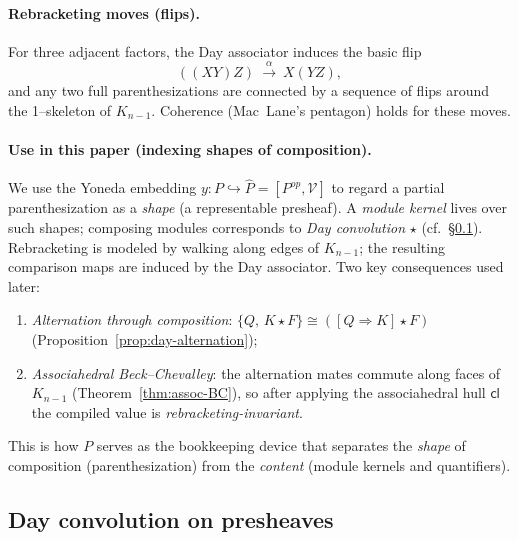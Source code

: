 \documentclass[11pt]{article}
\numberwithin{equation}{section}
\theoremstyle{upright}
\newcommand{\V}{\mathcal{V}}
\begin{document}
\paragraph{Rebracketing moves (flips).}
For three adjacent factors, the Day associator induces the basic flip
\[
((XY)Z)\ \xrightarrow{\ \alpha\ }\ X(YZ),
\]
and any two full parenthesizations are connected by a sequence of flips around the
1–skeleton of $K_{n-1}$. Coherence (Mac~Lane’s pentagon) holds for these moves.

\begin{center}
\end{center}

\paragraph{Use in this paper (indexing shapes of composition).}
We use the Yoneda embedding $y:P\hookrightarrow \widehat P=[P^{op},\V]$ to regard a
partial parenthesization as a \emph{shape} (a representable presheaf).
A \emph{module kernel} lives over such shapes; composing modules corresponds to
\emph{Day convolution} $\star$ (cf.\ \S\ref{subsec:day-conv}).
Rebracketing is modeled by walking along edges of $K_{n-1}$; the resulting comparison
maps are induced by the Day associator.
Two key consequences used later:
\begin{enumerate}[leftmargin=*, itemsep=.25ex]
\item \emph{Alternation through composition}:
$\{Q,\,K\star F\}\cong ([Q\Rightarrow K]\star F)$ (Proposition~\ref{prop:day-alternation});
\item \emph{Associahedral Beck--Chevalley}:
the alternation mates commute along faces of $K_{n-1}$ (Theorem~\ref{thm:assoc-BC}),
so after applying the associahedral hull $\mathsf{cl}$ the compiled value is
\emph{rebracketing-invariant}.
\end{enumerate}
This is how $P$ serves as the bookkeeping device that separates the \emph{shape} of
composition (parenthesization) from the \emph{content} (module kernels and quantifiers).

\subsection{Day convolution on presheaves}
\label{subsec:day-conv}
\end{document}
